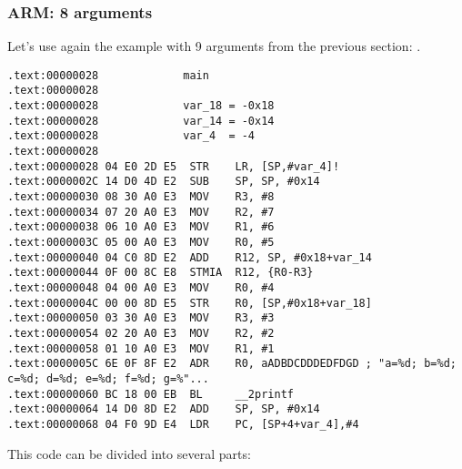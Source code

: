 \subsubsection{ARM: 8 arguments}

Let's use again the example with 9 arguments from the previous section: .



\myparagraph{\OptimizingKeilVI: \ARMMode}

\begin{lstlisting}
.text:00000028             main
.text:00000028
.text:00000028             var_18 = -0x18
.text:00000028             var_14 = -0x14
.text:00000028             var_4  = -4
.text:00000028
.text:00000028 04 E0 2D E5  STR    LR, [SP,#var_4]!
.text:0000002C 14 D0 4D E2  SUB    SP, SP, #0x14
.text:00000030 08 30 A0 E3  MOV    R3, #8
.text:00000034 07 20 A0 E3  MOV    R2, #7
.text:00000038 06 10 A0 E3  MOV    R1, #6
.text:0000003C 05 00 A0 E3  MOV    R0, #5
.text:00000040 04 C0 8D E2  ADD    R12, SP, #0x18+var_14
.text:00000044 0F 00 8C E8  STMIA  R12, {R0-R3}
.text:00000048 04 00 A0 E3  MOV    R0, #4
.text:0000004C 00 00 8D E5  STR    R0, [SP,#0x18+var_18]
.text:00000050 03 30 A0 E3  MOV    R3, #3
.text:00000054 02 20 A0 E3  MOV    R2, #2
.text:00000058 01 10 A0 E3  MOV    R1, #1
.text:0000005C 6E 0F 8F E2  ADR    R0, aADBDCDDDEDFDGD ; "a=%d; b=%d; c=%d; d=%d; e=%d; f=%d; g=%"...
.text:00000060 BC 18 00 EB  BL     __2printf
.text:00000064 14 D0 8D E2  ADD    SP, SP, #0x14
.text:00000068 04 F0 9D E4  LDR    PC, [SP+4+var_4],#4
\end{lstlisting}

This code can be divided into several parts:

